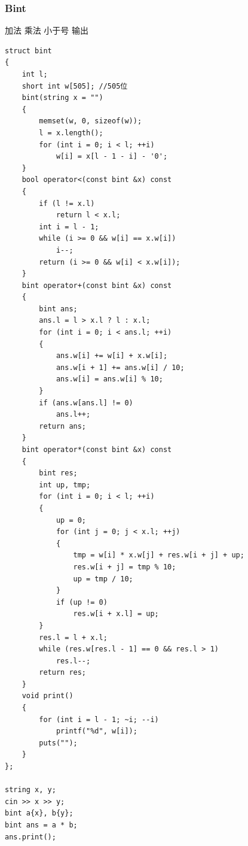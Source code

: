 \documentclass[twoside]{article}
\begin{document}
\subsubsection{Bint}
加法 乘法 小于号 输出
\begin{lstlisting}
struct bint
{
    int l;
    short int w[505]; //505位
    bint(string x = "")
    {
        memset(w, 0, sizeof(w));
        l = x.length();
        for (int i = 0; i < l; ++i)
            w[i] = x[l - 1 - i] - '0';
    }
    bool operator<(const bint &x) const
    {
        if (l != x.l)
            return l < x.l;
        int i = l - 1;
        while (i >= 0 && w[i] == x.w[i])
            i--;
        return (i >= 0 && w[i] < x.w[i]);
    }
    bint operator+(const bint &x) const
    {
        bint ans;
        ans.l = l > x.l ? l : x.l;
        for (int i = 0; i < ans.l; ++i)
        {
            ans.w[i] += w[i] + x.w[i];
            ans.w[i + 1] += ans.w[i] / 10;
            ans.w[i] = ans.w[i] % 10;
        }
        if (ans.w[ans.l] != 0)
            ans.l++;
        return ans;
    }
    bint operator*(const bint &x) const
    {
        bint res;
        int up, tmp;
        for (int i = 0; i < l; ++i)
        {
            up = 0;
            for (int j = 0; j < x.l; ++j)
            {
                tmp = w[i] * x.w[j] + res.w[i + j] + up;
                res.w[i + j] = tmp % 10;
                up = tmp / 10;
            }
            if (up != 0)
                res.w[i + x.l] = up;
        }
        res.l = l + x.l;
        while (res.w[res.l - 1] == 0 && res.l > 1)
            res.l--;
        return res;
    }
    void print()
    {
        for (int i = l - 1; ~i; --i)
            printf("%d", w[i]);
        puts("");
    }
};

string x, y;
cin >> x >> y;
bint a{x}, b{y};
bint ans = a * b;
ans.print();
\end{lstlisting}
\end{document}
